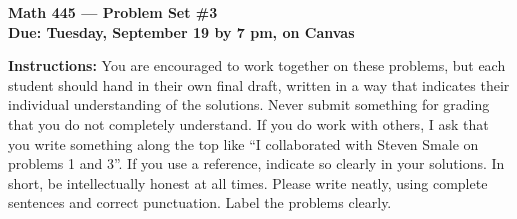 \documentclass{amsart}
\begin{document}
\begin{center}
{\large\bfseries
Math 445 --- Problem Set \#3 \\
Due: Tuesday, September 19 by 7 pm, on Canvas}
\end{center}





{\bf Instructions:} You are encouraged to work together on these
problems, but each student should hand in their own final draft,
written in a way that indicates their individual understanding of
the solutions. Never submit something for grading
that you do not completely understand. If you do work with others, I ask that you write something along the
top like ``I collaborated with Steven Smale on problems 1 and 3''.
If you use a reference, indicate so clearly in your solutions. 
In short, be intellectually
honest at all times. Please write neatly, using complete sentences and correct
punctuation. Label the problems clearly. 
\end{document}

